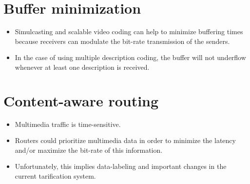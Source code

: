 
\section{Buffer minimization}

\begin{itemize}
\item Simulcasting and scalable video coding can help to minimize
  buffering times because receivers can modulate the bit-rate
  transmission of the senders.
\item In the case of using multiple description coding, the buffer
  will not underflow whenever at least one description is received.
\end{itemize}


\section{Content-aware routing}

\begin{itemize}
\item Multimedia traffic is time-sensitive.
\item Routers could prioritize multimedia data in order to minimize the
  latency and/or maximize the bit-rate of this information.
\item Unfortunately, this implies data-labeling and important changes
  in the current tarification system.
\end{itemize}



